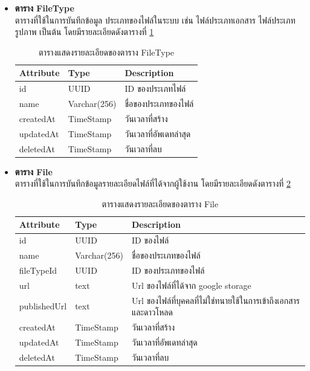 \documentclass[12pt,oneside,openright,a4paper]{cpe-thai-project}
\begin{document}
\begin{itemize}
\item \textbf{ตาราง FileType}\\
ตารางที่ใช้ในการบันทึกข้อมูล ประเภทของไฟล์ในระบบ เช่น ไฟล์ประเภทเอกสาร ไฟล์ประเภทรูปภาพ เป็นต้น โดยมีรายละเอียดดังตารางที่ \ref{tbl:dbFileType}
\begin{table}[!ht]
    \centering
    \begin{tabular}{|p{4cm}|p{2cm}|p{6cm}|}
    \hline
    \textbf{Attribute} & \textbf{Type} & \textbf{Description}   \\ \hline
    id                 & UUID          & ID ของประเภทไฟล์       \\ \hline
    name               & Varchar(256)   & ชื่อของประเภทของไฟล์   \\ \hline
    createdAt          & TimeStamp     & วันเวลาที่สร้าง        \\ \hline
    updatedAt          & TimeStamp     & วันเวลาที่อัพเดทล่าสุด \\ \hline
    deletedAt          & TimeStamp     & วันเวลาที่ลบ           \\ \hline
    \end{tabular}
    \caption{\centering  ตารางแสดงรายละเอียดของตาราง FileType} \label{tbl:dbFileType}
\end{table}


\item \textbf{ตาราง File}\\
ตารางที่ใช้ในการบันทึกข้อมูลรายละเอียดไฟล์ที่ได้จากผู้ใช้งาน โดยมีรายละเอียดดังตารางที่ \ref{tbl:dbFile}
\begin{table}[!ht]
    \centering
    \begin{tabular}{|p{4cm}|p{2cm}|p{6cm}|}
    \hline
    \textbf{Attribute} & \textbf{Type} & \textbf{Description}   \\ \hline
    id                 & UUID          & ID ของไฟล์                                                      \\ \hline
    name               & Varchar(256)   & ชื่อของประเภทของไฟล์                                            \\ \hline
    fileTypeId         & UUID          & ID ของประเภทของไฟล์                                             \\ \hline
    url                & text          & Url ของไฟล์ที่ได้จาก google storage                             \\ \hline
    publishedUrl       & text          & Url ของไฟล์ที่บุคคลที่ไม่ใช่ทนายใช้ในการเข้าถึงเอกสารและดาวโหลด \\ \hline
    createdAt          & TimeStamp     & วันเวลาที่สร้าง                                                 \\ \hline
    updatedAt          & TimeStamp     & วันเวลาที่อัพเดทล่าสุด                                          \\ \hline
    deletedAt          & TimeStamp     & วันเวลาที่ลบ                                                    \\ \hline
    \end{tabular}
    \caption{\centering  ตารางแสดงรายละเอียดของตาราง File} \label{tbl:dbFile}
\end{table}


\end{itemize}
\end{document}
